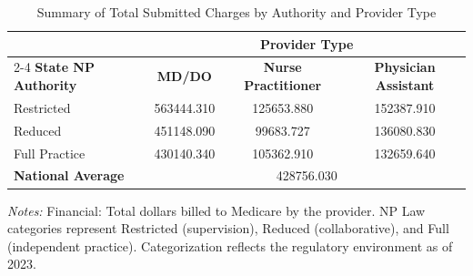 \begin{table}[htbp]
    \centering
    \caption{Summary of Total Submitted Charges by Authority and Provider Type}
    \label{tab:tot_sbmtd_chrg_provtype}
    \vspace{0.2cm}
    \begin{tabular}{lccc}
        \toprule
        & \multicolumn{3}{c}{\textbf{Provider Type}} \\
        \cmidrule(lr){2-4}
        \textbf{State NP Authority} & \textbf{MD/DO} & \textbf{Nurse Practitioner} & \textbf{Physician Assistant} \\
        \midrule
        Restricted & 563444.310 & 125653.880 & 152387.910 \\
        Reduced & 451148.090 & 99683.727 & 136080.830 \\
        Full Practice & 430140.340 & 105362.910 & 132659.640 \\
        \midrule
        \textbf{National Average} & \multicolumn{3}{c}{428756.030} \\
        \bottomrule
    \end{tabular}
    \vspace{0.1cm}
    \begin{minipage}{0.85\textwidth}
        \footnotesize \textit{Notes:} Financial: Total dollars billed to Medicare by the provider. NP Law categories represent Restricted (supervision), Reduced (collaborative), and Full (independent practice). Categorization reflects the regulatory environment as of 2023.
    \end{minipage}
\end{table}